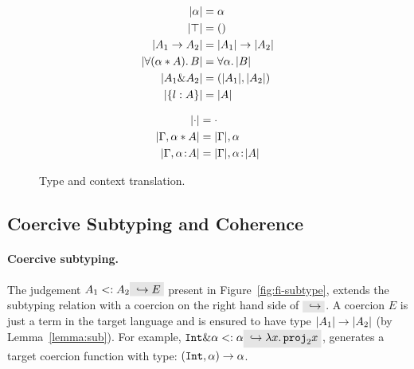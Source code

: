 \begin{figure}[!t]
\begin{spacing}{0.3}
\begin{minipage}[t]{.5\textwidth}
  \begin{align*}
    \lvert \alpha \rvert                &= \alpha \\
    \lvert \top \rvert                  &= () \\
    \lvert A_1 \to A_2 \rvert         &= \lvert A_1 \rvert \to \lvert A_2 \rvert \\
    \lvert \forall (\alpha * A).\, B \rvert  &= \forall \alpha.\, \lvert B \rvert \\
    \lvert A_1 \& A_2 \rvert      &= (\lvert A_1 \rvert, \lvert A_2 \rvert) \\
    \lvert \{ l : A \} \rvert     &= \lvert A \rvert \\
  \end{align*}
\end{minipage}
\begin{minipage}[t]{.5\textwidth}
  \begin{align*}
    \lvert \cdot \rvert                        &= \cdot \\
    \lvert \Gamma, \alpha * A \rvert &= \lvert \Gamma \rvert, \alpha \\
    \lvert \Gamma, \alpha \!:\! A \rvert   &= \lvert \Gamma \rvert, \alpha \!:\! \lvert A \rvert
  \end{align*}
\end{minipage}
\end{spacing}
  \caption{Type and context translation.}
  \label{fig:type-and-context-translation}
\end{figure}



\subsection{Coercive Subtyping and Coherence}

\paragraph{Coercive subtyping.}
The judgement $A_1 \subtype A_2 \yields E$
present in Figure~\ref{fig:fi-subtype}, extends the subtyping relation 
with a coercion on the right hand side of $ \yields {} $. A coercion $ E $ is just a term
in the target language and is ensured to have type
$ \lvert A_1 \rvert \to \lvert A_2 \rvert $ (by Lemma~\ref{lemma:sub}). For example,
$\tyint \inter \alpha \subtype \alpha \yields {\lamty x {\im {\tyint \inter \tybool}} {\proj 2 x}}$,
generates a target coercion function with type: $(\texttt{Int},\alpha) \to \alpha$.

